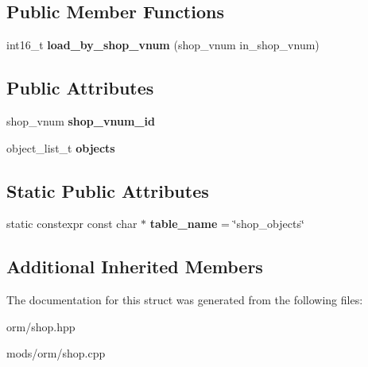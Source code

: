 \subsection*{Public Member Functions}
\begin{DoxyCompactItemize}
\item 
\mbox{\label{structmods_1_1orm_1_1shop__objects_ab8396d7c2b1aa803dbbe83e64e198e15}} 
int16\+\_\+t {\bfseries load\+\_\+by\+\_\+shop\+\_\+vnum} (shop\+\_\+vnum in\+\_\+shop\+\_\+vnum)
\end{DoxyCompactItemize}
\subsection*{Public Attributes}
\begin{DoxyCompactItemize}
\item 
\mbox{\label{structmods_1_1orm_1_1shop__objects_a673e6ff8a83360120b02c2cb33524170}} 
shop\+\_\+vnum {\bfseries shop\+\_\+vnum\+\_\+id}
\item 
\mbox{\label{structmods_1_1orm_1_1shop__objects_a73edb392f00af25843b66693a5653466}} 
object\+\_\+list\+\_\+t {\bfseries objects}
\end{DoxyCompactItemize}
\subsection*{Static Public Attributes}
\begin{DoxyCompactItemize}
\item 
\mbox{\label{structmods_1_1orm_1_1shop__objects_a8f89e1e63ec3d71c9f6f33b5bf088865}} 
static constexpr const char $\ast$ {\bfseries table\+\_\+name} = \char`\"{}shop\+\_\+objects\char`\"{}
\end{DoxyCompactItemize}
\subsection*{Additional Inherited Members}


The documentation for this struct was generated from the following files\+:\begin{DoxyCompactItemize}
\item 
orm/shop.\+hpp\item 
mods/orm/shop.\+cpp\end{DoxyCompactItemize}
